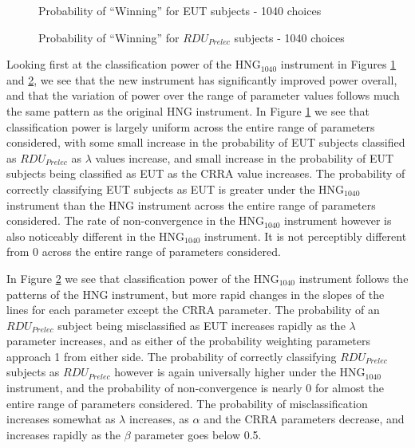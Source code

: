\documentclass[../main.tex]{subfiles}
\begin{document}
\begin{figure}[hp!]
	\center
	\caption{Probability of \enquote{Winning} for EUT subjects - 1040 choices}
	\label{fig:HNG_win_eut}
\end{figure}

\begin{figure}[hp!]
	\center
	\caption{Probability of \enquote{Winning} for $\mathit{RDU_{Prelec}}$ subjects - 1040 choices}
	\label{fig:HNG_win_pre}
\end{figure}

Looking first at the classification power of the $\text{HNG}_{1040}$ instrument in Figures \ref{fig:HNG_win_eut} and \ref{fig:HNG_win_pre}, we see that the new instrument has significantly improved power overall, and that the variation of power over the range of parameter values follows much the same pattern as the original HNG instrument.
In Figure \ref{fig:HNG_win_eut} we see that classification power is largely uniform across the entire range of parameters considered, with some small increase in the probability of EUT subjects classified as $\mathit{RDU_{Prelec}}$ as $\lambda$ values increase, and small increase in the probability of EUT subjects being classified as EUT as the CRRA value increases.
The probability of correctly classifying EUT subjects as EUT is greater under the $\text{HNG}_{1040}$ instrument than the HNG instrument across the entire range of parameters considered.
The rate of non-convergence in the $\text{HNG}_{1040}$ instrument however is also noticeably different in the $\text{HNG}_{1040}$ instrument.
It is not perceptibly different from 0 across the entire range of parameters considered.

In Figure \ref{fig:HNG_win_pre} we see that classification power of the $\text{HNG}_{1040}$ instrument follows the patterns of the HNG instrument, but more rapid changes in the slopes of the lines for each parameter except the CRRA parameter.
The probability of an $\mathit{RDU_{Prelec}}$ subject being misclassified as EUT increases rapidly as the $\lambda$ parameter increases, and as either of the probability weighting parameters approach 1 from either side.
The probability of correctly classifying $\mathit{RDU_{Prelec}}$ subjects as $\mathit{RDU_{Prelec}}$ however is again universally higher under the $\text{HNG}_{1040}$ instrument, and the probability of non-convergence is nearly 0 for almost the entire range of parameters considered.
The probability of misclassification increases somewhat as $\lambda$ increases, as $\alpha$ and the CRRA parameters decrease, and increases rapidly as the $\beta$ parameter goes below 0.5.
\end{document}

